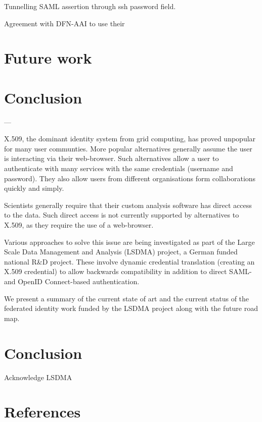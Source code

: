 \documentclass[a4paper]{jpconf}
\begin{document}
Tunnelling SAML assertion through ssh password field.

Agreement with DFN-AAI to use their 

\section{Future work}

\section{Conclusion}


---

X.509, the dominant identity system from grid computing, has proved
unpopular for many user communties. More popular alternatives
generally assume the user is interacting via their web-browser. Such
alternatives allow a user to authenticate with many services with the
same credentials (username and password). They also allow users from
different organisations form collaborations quickly and simply.

Scientists generally require that their custom analysis software has
direct access to the data. Such direct access is not currently
supported by alternatives to X.509, as they require the use of a
web-browser.

Various approaches to solve this issue are being investigated as part
of the Large Scale Data Management and Analysis (LSDMA) project, a
German funded national R\&D project. These involve dynamic credential
translation (creating an X.509 credential) to allow backwards
compatibility in addition to direct SAML- and OpenID Connect-based
authentication.

We present a summary of the current state of art and the current
status of the federated identity work funded by the LSDMA project
along with the future road map.

\section{Conclusion}

\ack

Acknowledge LSDMA

\section*{References}

\end{document}
